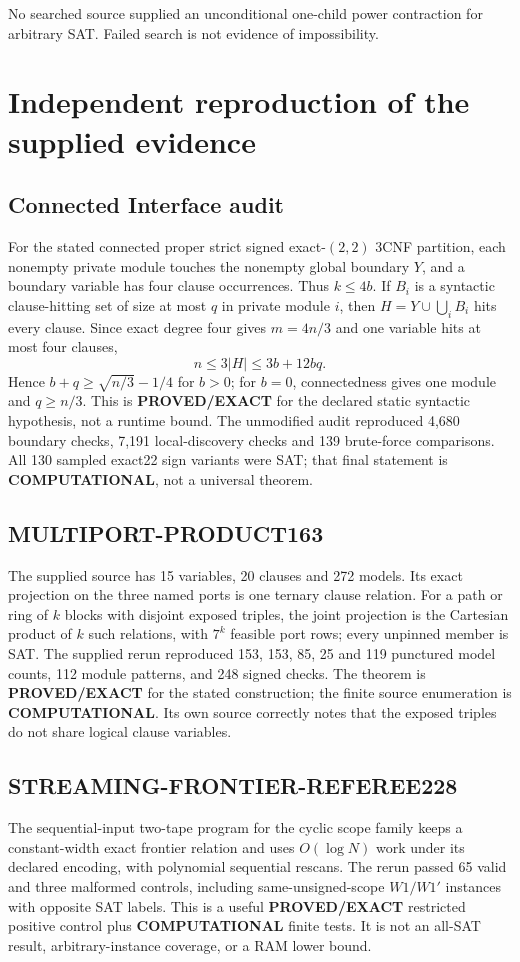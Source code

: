\documentclass[11pt]{article}
\begin{document}
No searched source supplied an unconditional one-child power contraction for
arbitrary SAT.  Failed search is not evidence of impossibility.

\section{Independent reproduction of the supplied evidence}
\subsection{Connected Interface audit}
For the stated connected proper strict signed exact-$(2,2)$ 3CNF partition,
each nonempty private module touches the nonempty global boundary $Y$, and a
boundary variable has four clause occurrences.  Thus $k\le4b$.  If $B_i$ is a
syntactic clause-hitting set of size at most $q$ in private module $i$, then
$H=Y\cup\bigcup_i B_i$ hits every clause.  Since exact degree four gives
$m=4n/3$ and one variable hits at most four clauses,
\[
  n\le3|H|\le3b+12bq.
\]
Hence $b+q\ge\sqrt{n/3}-1/4$ for $b>0$; for $b=0$, connectedness gives one
module and $q\ge n/3$.  This is \textbf{PROVED/EXACT} for the declared static
syntactic hypothesis, not a runtime bound.  The unmodified audit reproduced
4,680 boundary checks, 7,191 local-discovery checks and 139 brute-force
comparisons.  All 130 sampled exact22 sign variants were SAT; that final
statement is \textbf{COMPUTATIONAL}, not a universal theorem.

\subsection{MULTIPORT-PRODUCT163}
The supplied source has 15 variables, 20 clauses and 272 models.  Its exact
projection on the three named ports is one ternary clause relation.  For a
path or ring of $k$ blocks with disjoint exposed triples, the joint projection
is the Cartesian product of $k$ such relations, with $7^k$ feasible port rows;
every unpinned member is SAT.  The supplied rerun reproduced 153, 153, 85, 25
and 119 punctured model counts, 112 module patterns, and 248 signed checks.
The theorem is \textbf{PROVED/EXACT} for the stated construction; the finite
source enumeration is \textbf{COMPUTATIONAL}.  Its own source correctly notes
that the exposed triples do not share logical clause variables.

\subsection{STREAMING-FRONTIER-REFEREE228}
The sequential-input two-tape program for the cyclic scope family keeps a
constant-width exact frontier relation and uses $O(\log N)$ work under its
declared encoding, with polynomial sequential rescans.  The rerun passed 65
valid and three malformed controls, including same-unsigned-scope $W1/W1'$
instances with opposite SAT labels.  This is a useful \textbf{PROVED/EXACT}
restricted positive control plus \textbf{COMPUTATIONAL} finite tests.  It is
not an all-SAT result, arbitrary-instance coverage, or a RAM lower bound.
\end{document}

